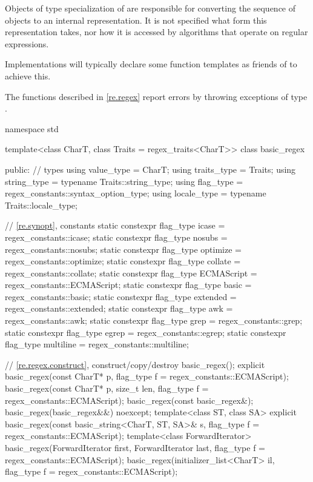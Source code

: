 \pnum
Objects of type specialization of  are responsible for
converting the sequence of  objects to an internal
representation. It is not specified what form this representation
takes, nor how it is accessed by algorithms that operate on regular
expressions.
\begin{note}
Implementations will typically declare
some function templates as friends of  to achieve
this.
\end{note}

\pnum
{}%
The functions described in \ref{re.regex} report errors by throwing
exceptions of type .

%
\begin{codeblock}
namespace std {
  template<class CharT, class Traits = regex_traits<CharT>>
    class basic_regex {
    public:
      // types
      using value_type  =          CharT;
      using traits_type =          Traits;
      using string_type = typename Traits::string_type;
      using flag_type   =          regex_constants::syntax_option_type;
      using locale_type = typename Traits::locale_type;

      // \ref{re.synopt}, constants
      static constexpr flag_type icase = regex_constants::icase;
      static constexpr flag_type nosubs = regex_constants::nosubs;
      static constexpr flag_type optimize = regex_constants::optimize;
      static constexpr flag_type collate = regex_constants::collate;
      static constexpr flag_type ECMAScript = regex_constants::ECMAScript;
      static constexpr flag_type basic = regex_constants::basic;
      static constexpr flag_type extended = regex_constants::extended;
      static constexpr flag_type awk = regex_constants::awk;
      static constexpr flag_type grep = regex_constants::grep;
      static constexpr flag_type egrep = regex_constants::egrep;
      static constexpr flag_type multiline = regex_constants::multiline;

      // \ref{re.regex.construct}, construct/copy/destroy
      basic_regex();
      explicit basic_regex(const CharT* p, flag_type f = regex_constants::ECMAScript);
      basic_regex(const CharT* p, size_t len, flag_type f = regex_constants::ECMAScript);
      basic_regex(const basic_regex&);
      basic_regex(basic_regex&&) noexcept;
      template<class ST, class SA>
        explicit basic_regex(const basic_string<CharT, ST, SA>& s,
                             flag_type f = regex_constants::ECMAScript);
      template<class ForwardIterator>
        basic_regex(ForwardIterator first, ForwardIterator last,
                    flag_type f = regex_constants::ECMAScript);
      basic_regex(initializer_list<CharT> il, flag_type f = regex_constants::ECMAScript);

}}
\end{codeblock}
